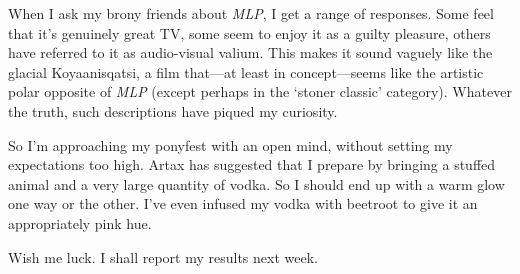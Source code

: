 When I ask my brony friends about \textit{MLP}, I get a range of responses. Some feel that it’s genuinely great TV, some seem to enjoy it as a guilty pleasure, others have referred to it as audio-visual valium. This makes it sound vaguely like the glacial Koyaanisqatsi, a film that—at least in concept—seems like the artistic polar opposite of \textit{MLP} (except perhaps in the ‘stoner classic’ category). Whatever the truth, such descriptions have piqued my curiosity.

So I’m approaching my ponyfest with an open mind, without setting my expectations too high. Artax has suggested that I prepare by bringing a stuffed animal and a very large quantity of vodka. So I should end up with a warm glow one way or the other. I’ve even infused my vodka with beetroot to give it an appropriately pink hue.

Wish me luck. I shall report my results next week.
